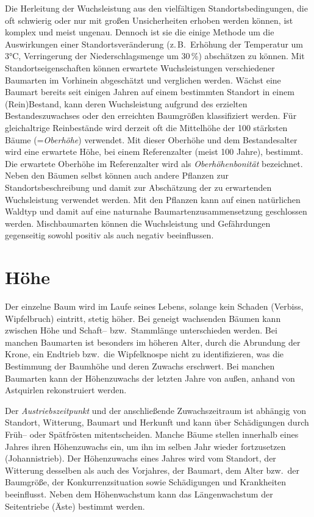 \documentclass[twocolumn]{scrartcl}
\begin{document}
Die Herleitung der Wuchsleistung aus den vielfältigen Standortsbedingungen, die
oft schwierig oder nur mit großen Unsicherheiten erhoben werden können, ist
komplex und meist ungenau. Dennoch ist sie die einige Methode um die
Auswirkungen einer Standortsveränderung (z.\,B.\ Erhöhung der Temperatur um 3°C,
Verringerung der Niederschlagsmenge um 30\,\%) abschätzen zu können. Mit
Standortseigenschaften können erwartete Wuchsleistungen verschiedener Baumarten
im Vorhinein abgeschätzt und verglichen werden. Wächst eine Baumart bereits seit
einigen Jahren auf einem bestimmten Standort in einem (Rein)Bestand, kann deren
Wuchsleistung aufgrund des erzielten Bestandeszuwachses oder den erreichten
Baumgrößen klassifiziert werden. Für gleichaltrige Reinbestände wird derzeit oft
die Mittelhöhe der 100 stärksten Bäume (=\emph{Oberhöhe}) verwendet. Mit dieser
Oberhöhe und dem Bestandesalter wird eine erwartete Höhe, bei einem
Referenzalter (meist 100 Jahre), bestimmt. Die erwartete Oberhöhe im
Referenzalter wird als \emph{Oberhöhenbonität} bezeichnet. Neben den Bäumen
selbst können auch andere Pflanzen zur Standortsbeschreibung und damit zur
Abschätzung der zu erwartenden Wuchsleistung verwendet werden. Mit den Pflanzen
kann auf einen natürlichen Waldtyp und damit auf eine naturnahe
Baumartenzusammensetzung geschlossen werden. Mischbaumarten können die
Wuchsleistung und Gefährdungen gegenseitig sowohl positiv als auch negativ
beeinflussen.

\section{Höhe}

Der einzelne Baum wird im Laufe seines Lebens, solange kein Schaden (Verbiss,
Wipfelbruch) eintritt, stetig höher. Bei geneigt wachsenden Bäumen kann zwischen
Höhe und Schaft-- bzw.\ Stammlänge unterschieden werden. Bei manchen Baumarten
ist besonders im höheren Alter, durch die Abrundung der Krone, ein Endtrieb
bzw.\ die Wipfelknospe nicht zu identifizieren, was die Bestimmung der Baumhöhe
und deren Zuwachs erschwert. Bei manchen Baumarten kann der Höhenzuwachs der
letzten Jahre von außen, anhand von Astquirlen rekonstruiert werden.

Der \emph{Austriebszeitpunkt} und der anschließende Zuwachszeitraum ist abhängig
von Standort, Witterung, Baumart und Herkunft und kann über Schädigungen durch
Früh-- oder Spätfrösten mitentscheiden. Manche Bäume stellen innerhalb eines
Jahres ihren Höhenzuwachs ein, um ihn im selben Jahr wieder fortzusetzen
(Johannistrieb). Der Höhenzuwachs eines Jahres wird vom Standort, der Witterung
desselben als auch des Vorjahres, der Baumart, dem Alter bzw.\ der Baumgröße,
der Konkurrenzsituation sowie Schädigungen und Krankheiten beeinflusst. Neben
dem Höhenwachstum kann das Längenwachstum der Seitentriebe (Äste) bestimmt
werden.
\end{document}
